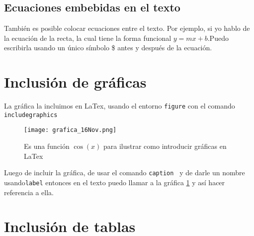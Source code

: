 \documentclass[onecolumn]{article} %
\begin{document}
\subsection{Ecuaciones embebidas en el texto}
También es posible colocar ecuaciones entre el texto. Por ejemplo, si yo hablo de la ecuación de la recta, la cual tiene la forma funcional $y=mx+b$.Puedo escribirla usando un único símbolo \$ antes y después de la ecuación.


\section{Inclusión de gráficas} %
La gráfica la incluimos en LaTex, usando el entorno \verb+figure+ con el comando \verb+includegraphics+
\begin{figure}[h!]%
\centering %
\texttt{[image: grafica\_16Nov.png]}
\caption{\label{fig_cos}Es una función $\cos(x)$ para ilustrar como introducir gráficas en LaTex} %
\end{figure}
Luego de incluir la gráfica, de usar el comando \verb+caption + y de darle un nombre usando\verb+label+ entonces en el texto puedo llamar a la gráfica \ref{fig_cos} y así hacer referencia a ella.

\section{Inclusión de tablas} %
\end{document}
